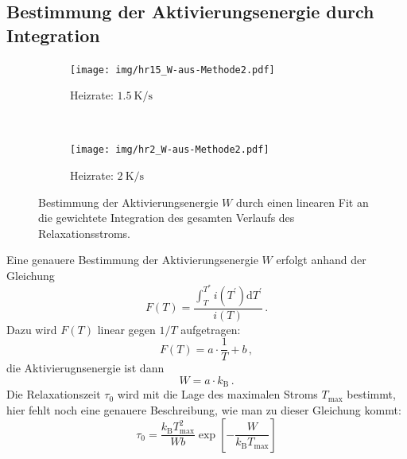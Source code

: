 \subsection{Bestimmung der Aktivierungsenergie durch Integration}

\begin{figure}[htp]
    \centering
    \begin{subfigure}[t]{0.5\textwidth}
        \centering
        \texttt{[image: img/hr15\_W-aus-Methode2.pdf]}
        \caption{Heizrate: $\SI{1.5}{\kelvin\per\second}$}
    \end{subfigure}%
    ~
    \begin{subfigure}[t]{0.5\textwidth}
        \centering
        \texttt{[image: img/hr2\_W-aus-Methode2.pdf]}
        \caption{Heizrate: $\SI{2}{\kelvin\per\second}$}
    \end{subfigure}
    \caption{Bestimmung der Aktivierungsenergie $W$ durch einen linearen Fit an die gewichtete Integration des gesamten Verlaufs des Relaxationsstroms.}
\end{figure}

Eine genauere Bestimmung der Aktivierungsenergie $W$ erfolgt anhand der Gleichung
\begin{equation*}
    F(T) = \frac{\int_T^{T^\ast} i(T^\prime)\mathrm{d}T^\prime}{i(T)}\,.
\end{equation*}
Dazu wird $F(T)$ linear gegen $1/T$ aufgetragen:
\begin{equation*}
    F(T) = a \cdot\frac{1}{T} + b\,,
\end{equation*}
die Aktivierugnsenergie ist dann
\begin{equation*}
    W = a \cdot k_\text{B}\,.
\end{equation*}
Die Relaxationszeit $\tau_0$ wird mit die Lage des maximalen Stroms $T_\text{max}$ bestimmt, hier fehlt noch eine genauere Beschreibung, wie man zu dieser Gleichung kommt:
\begin{equation}
    \label{eqn:tau0}
    \tau_0 = \frac{k_\text{B}T_\text{max}^2}{Wb}
             \exp\!\left[-\frac{W}{k_\text{B}T_\text{max}} \right]
\end{equation}

